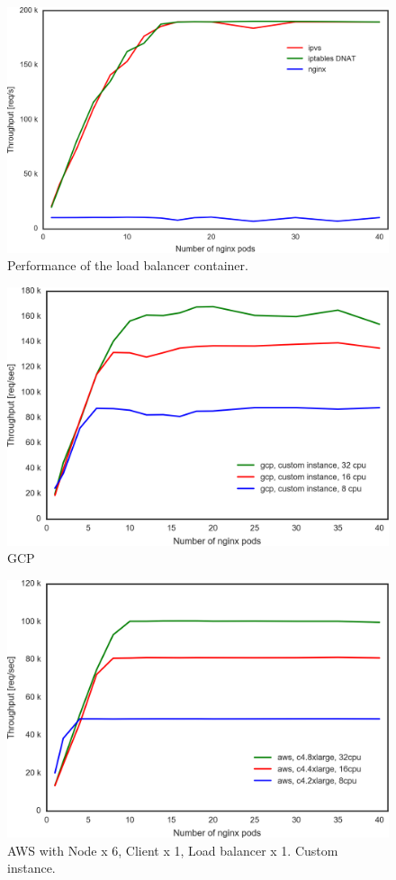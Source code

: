 \begin{figure}[t]
  \includegraphics[width=0.9\columnwidth]{Figs/ipvs-iptables-nginx}
  \caption{Performance of the load balancer container.}
  \label{fig:ipvs-iptables-nginx}
\end{figure}


\begin{figure}[t]
    \includegraphics[width=0.9\columnwidth]{Figs/gcp_all_ieice}
    \caption{GCP}
    \label{fig:gcp_all_ieice}
\end{figure}

\begin{figure}[t]
    \includegraphics[width=0.9\columnwidth]{Figs/aws_c4_ieice}
    \caption{AWS with Node x 6, Client x 1, Load balancer x 1. Custom instance. }
    \label{fig:aws_c4_ieice}
\end{figure}

